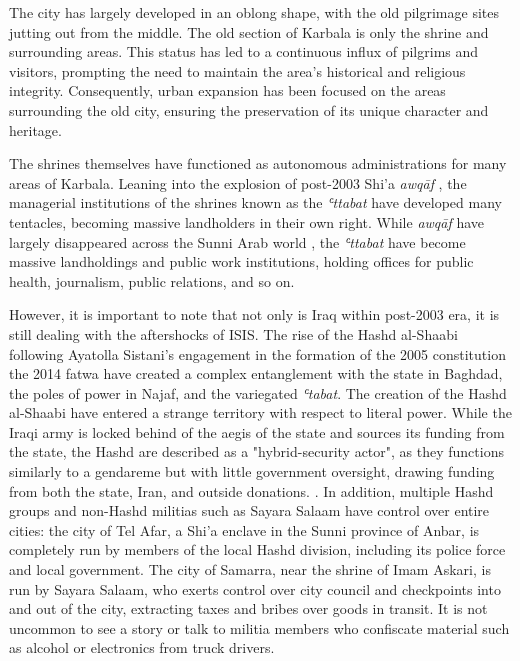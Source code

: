 The city has largely developed in an oblong shape, with the old pilgrimage sites jutting out from the middle. The old section of Karbala is only the shrine and surrounding areas. This status has led to a continuous influx of pilgrims and visitors, prompting the need to maintain the area's historical and religious integrity. Consequently, urban expansion has been focused on the areas surrounding the old city, ensuring the preservation of its unique character and heritage.

The shrines themselves have functioned as autonomous administrations for many areas of Karbala. Leaning into the explosion of post-2003 Shi'a \emph{awqāf} \cite{hamdan_development_2012}, the managerial institutions of the shrines known as the \emph{ʿttabat}  have developed many tentacles, becoming massive landholders in their own right. While \emph{awqāf} have largely disappeared across the Sunni Arab world \cite{moumtaz_gods_2021}, the \emph{ʿttabat}  have become massive landholdings and public work institutions, holding offices for public health, journalism, public relations, and so on. 

However, it is important to note that not only is Iraq within post-2003 era, it is still dealing with the aftershocks of ISIS. The rise of the Hashd al-Shaabi following Ayatolla Sistani's engagement in the formation of the 2005 constitution \cite{al-rahim_sistani_2005} the 2014 fatwa \cite{rudolf_battlefield_2018}\cite{ann_wainscott_engaging_2019} have created a complex entanglement with the state in Baghdad, the poles of power in Najaf, and the variegated \emph{ʿtabat}. The creation of the Hashd al-Shaabi have entered a strange territory with respect to literal power. While the Iraqi army is locked behind of the aegis of the state and sources its funding from the state, the Hashd are described as a "hybrid-security actor", as they functions similarly to a gendareme but with little government oversight, drawing funding from both the state, Iran, and outside donations.\cite{cambanis_hybrid_2019} \cite{renad_mansour_popular_2018}. In addition, multiple Hashd groups and non-Hashd militias such as Sayara Salaam have control over entire cities: the city of Tel Afar, a Shi'a enclave in the Sunni province of Anbar, is completely run by members of the local Hashd division, including its police force and local government. The city of Samarra, near the shrine of Imam Askari, is run by Sayara Salaam, who exerts control over city council and checkpoints into and out of the city, extracting taxes and bribes over goods in transit. It is not uncommon to see a story or talk to militia members who confiscate material such as alcohol or electronics from truck drivers. 

